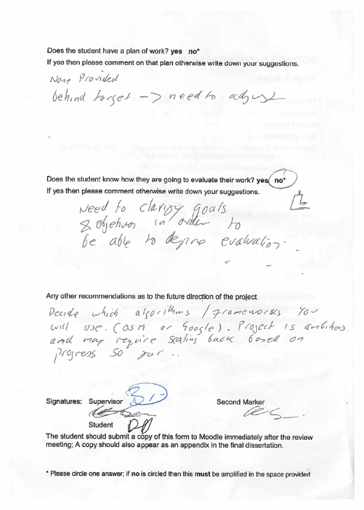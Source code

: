 \documentclass[12pt,a4paper]{article}
\begin{document}
\begin{appendices}
\includegraphics[width=\textwidth,height=\textheight,keepaspectratio]{./appendicies/40203045_interim-2.pdf}


\end{appendices}
\end{document}
